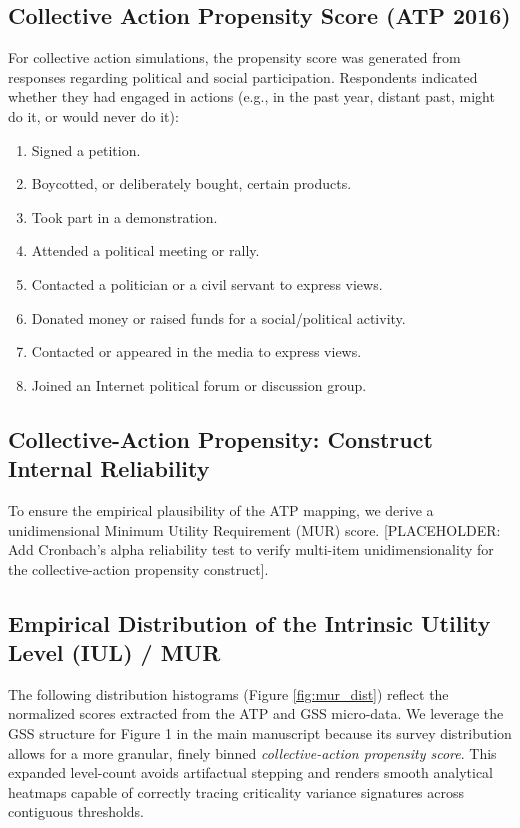 \documentclass[11pt,a4paper]{article}
\begin{document}
\subsection{Collective Action Propensity Score (ATP 2016)}
For collective action simulations, the propensity score was generated from responses regarding political and social participation. Respondents indicated whether they had engaged in actions (e.g., in the past year, distant past, might do it, or would never do it):
\begin{enumerate}
    \item Signed a petition.
    \item Boycotted, or deliberately bought, certain products.
    \item Took part in a demonstration.
    \item Attended a political meeting or rally.
    \item Contacted a politician or a civil servant to express views.
    \item Donated money or raised funds for a social/political activity.
    \item Contacted or appeared in the media to express views.
    \item Joined an Internet political forum or discussion group.
\end{enumerate}

\subsection{Collective-Action Propensity: Construct Internal Reliability}
To ensure the empirical plausibility of the ATP mapping, we derive a unidimensional Minimum Utility Requirement (MUR) score. 
[PLACEHOLDER: Add Cronbach's alpha reliability test to verify multi-item unidimensionality for the collective-action propensity construct]. 

\subsection{Empirical Distribution of the Intrinsic Utility Level (IUL) / MUR}
The following distribution histograms (Figure \ref{fig:mur_dist}) reflect the normalized scores extracted from the ATP and GSS micro-data. We leverage the GSS structure for Figure 1 in the main manuscript because its survey distribution allows for a more granular, finely binned \textit{collective-action propensity score}. This expanded level-count avoids artifactual stepping and renders smooth analytical heatmaps capable of correctly tracing criticality variance signatures across contiguous thresholds.
\end{document}

